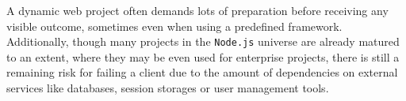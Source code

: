 A dynamic web project often demands lots of preparation before receiving any visible outcome, sometimes even when using a predefined framework. Additionally, though many projects in the \texttt{Node.js} universe are already matured to an extent, where they may be even used for enterprise projects, there is still a remaining risk for failing a client due to the amount of dependencies on external services like databases, session storages or user management tools.




